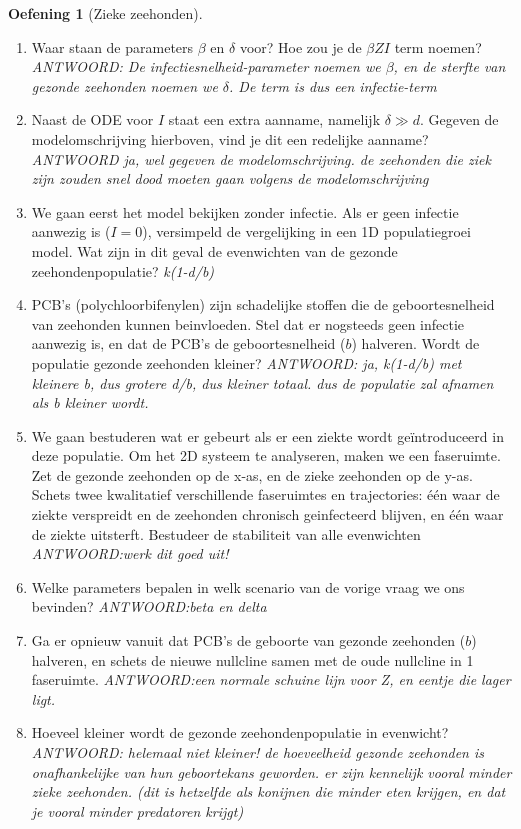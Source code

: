 \documentclass[
  a4paper,
]{scrbook}
\theoremstyle{definition}
\newtheorem{exercise}{Oefening}[chapter]
\theoremstyle{remark}
\begin{document}
\begin{exercise}[Zieke
zeehonden]
\begin{enumerate}
\def\labelenumi{\alph{enumi}.}
\item
  Waar staan de parameters \(\beta\) en \(\delta\) voor? Hoe zou je de
  \(\beta ZI\) term noemen? \emph{ANTWOORD: De
  infectiesnelheid-parameter noemen we \(\beta\), en de sterfte van
  gezonde zeehonden noemen we \(\delta\). De term is dus een
  infectie-term}
\item
  Naast de ODE voor \(I\) staat een extra aanname, namelijk
  \(\delta \gg d\). Gegeven de modelomschrijving hierboven, vind je dit
  een redelijke aanname? \emph{ANTWOORD ja, wel gegeven de
  modelomschrijving. de zeehonden die ziek zijn zouden snel dood moeten
  gaan volgens de modelomschrijving}
\item
  We gaan eerst het model bekijken zonder infectie. Als er geen infectie
  aanwezig is (\(I=0\)), versimpeld de vergelijking in een 1D
  populatiegroei model. Wat zijn in dit geval de evenwichten van de
  gezonde zeehondenpopulatie? \emph{k(1-d/b)}
\item
  PCB's (polychloorbifenylen) zijn schadelijke stoffen die de
  geboortesnelheid van zeehonden kunnen beinvloeden. Stel dat er
  nogsteeds geen infectie aanwezig is, en dat de PCB's de
  geboortesnelheid (\(b\)) halveren. Wordt de populatie gezonde
  zeehonden kleiner? \emph{ANTWOORD: ja, k(1-d/b) met kleinere b, dus
  grotere d/b, dus kleiner totaal. dus de populatie zal afnamen als b
  kleiner wordt.}
\item
  We gaan bestuderen wat er gebeurt als er een ziekte wordt
  geïntroduceerd in deze populatie. Om het 2D systeem te analyseren,
  maken we een faseruimte. Zet de gezonde zeehonden op de x-as, en de
  zieke zeehonden op de y-as. Schets twee kwalitatief verschillende
  faseruimtes en trajectories: één waar de ziekte verspreidt en de
  zeehonden chronisch geinfecteerd blijven, en één waar de ziekte
  uitsterft. Bestudeer de stabiliteit van alle evenwichten
  \emph{ANTWOORD:werk dit goed uit!}
\item
  Welke parameters bepalen in welk scenario van de vorige vraag we ons
  bevinden? \emph{ANTWOORD:beta en delta}
\item
  Ga er opnieuw vanuit dat PCB's de geboorte van gezonde zeehonden
  (\(b\)) halveren, en schets de nieuwe nullcline samen met de oude
  nullcline in 1 faseruimte. \emph{ANTWOORD:een normale schuine lijn
  voor Z, en eentje die lager ligt.}
\item
  Hoeveel kleiner wordt de gezonde zeehondenpopulatie in evenwicht?
  \emph{ANTWOORD: helemaal niet kleiner! de hoeveelheid gezonde
  zeehonden is onafhankelijke van hun geboortekans geworden. er zijn
  kennelijk vooral minder zieke zeehonden. (dit is hetzelfde als
  konijnen die minder eten krijgen, en dat je vooral minder predatoren
  krijgt)}
\end{enumerate}

\end{exercise}
\end{document}
